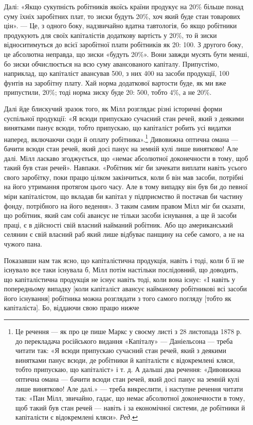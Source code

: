\parcont{}  %
Далі: «Якщо сукупність робітників якоїсь країни продукує
на 20\% більше понад суму їхніх заробітних плат, то зиски будуть
20\%, хоч який буде стан товарових цін». — Це, з одного
боку, надзвичайно вдатна тавтологія, бо якщо робітники продукують
для своїх капіталістів додаткову вартість у 20\%, то й зиски
відноситимуться до всієї заробітної плати робітників як 20: 100.
З другого боку, це абсолютна неправда, що зиски «будуть 20\%».
Вони завжди мусять бути менші, бо зиски обчислюється на всю
суму авансованого капіталу. Припустімо, наприклад, що капіталіст
авансував 500, з них 400
на засоби продукції, 100 фунтів на заробітну плату. Хай
норма додаткової вартости буде, як ми вже припустили, 20\%;
тоді норма зиску буде 20: 500, тобто 4\%, а не 20\%.

Далі йде блискучий зразок того, як Мілл розглядає різні
історичні форми суспільної продукції: «Я всюди припускаю
сучасний стан речей, який з деякими винятками панує всюди,
тобто припускаю, що капіталіст робить усі видатки наперед,
включаючи сюди й оплату робітника».\footnote*{
Це речення — як про це пише Маркс у своєму листі з 28 листопада
1878 р. до перекладача російського видання «Капіталу» — Даніельсона —
треба читати так: «Я всюди припускаю сучасний стан речей, який з деякими
винятками панує всюди, де робітники й капіталісти є відокремлені
кляси, тобто припускаю, що капіталіст» і т. д. А дальші два речення:
«Дивовижна оптична омана — бачити всюди стан речей, який досі
панує на земній кулі лише винятково! Але далі.» — треба викреслити, і
наступне речення читати так: «Пан Мілл, звичайно, гадає, що немає
абсолютної доконечности в тому, щоб такий був стан речей — навіть
і за економічної системи, де робітники й капіталісти є відокремлені
кляси». \emph{Ред.}
} Дивовижна оптична
омана — бачити всюди стан речей, який досі панує на земній
кулі лише винятково! Але далі. Мілл ласкаво згоджується, що
«немає абсолютної доконечности в тому, щоб такий був стан
речей». Навпаки. «Робітник міг би зачекати виплати навіть
усього свого заробітку, поки працю цілком закінчиться, коли б
він мав засоби, потрібні на його утримання протягом цього часу.
Але в тому випадку він був би до певної міри капіталістом, що
вкладав би капітал у підприємство й постачав би частину фонду,
потрібного на його ведення». З таким самим правом Мілл міг би
сказати, що робітник, який сам собі авансує не тільки засоби
існування, а ще й засоби праці, є в дійсності свій власний найманий
робітник. Або що американський селянин є свій власний
раб який лише відбуває панщину на себе самого, а не на чужого
пана.

Показавши нам так ясно, що капіталістична продукція, навіть
і тоді, коли б її не існувало все таки існувала б, Мілл потім
настільки послідовний, що доводить, що капіталістична продукція
не існує навіть тоді, коли вона існує: «І навіть у попередньому
випадку [коли капіталіст авансує найманому робітникові всі
засоби його існування] робітника можна розглядати з того самого
погляду [тобто як капіталіста]. Бо, віддаючи свою працю нижче
\parbreak{}  %
